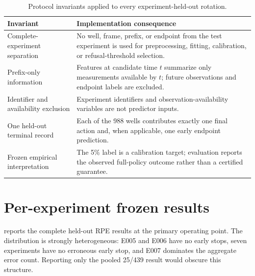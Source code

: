 \documentclass[11pt,twocolumn]{article}
\begin{document}
\begin{table}[H]
\centering
\caption{Protocol invariants applied to every experiment-held-out rotation.}
\label{tab:invariants}
\normalsize
\begin{tabularx}{0.96\textwidth}{@{}>{\raggedright\arraybackslash}p{}>{\raggedright\arraybackslash}X@{}}
\toprule
Invariant & Implementation consequence \\
\midrule
Complete-experiment separation & No well, frame, prefix, or endpoint from the test experiment is
used for preprocessing, fitting, calibration, or refusal-threshold selection. \\
Prefix-only information & Features at candidate time $t$ summarize only measurements available by
$t$; future observations and endpoint labels are excluded. \\
Identifier and availability exclusion & Experiment identifiers and observation-availability
variables are not predictor inputs. \\
One held-out terminal record & Each of the 988 wells contributes exactly one final action and, when
applicable, one early endpoint prediction. \\
Frozen empirical interpretation & The 5\% label is a calibration target; evaluation reports the
observed full-policy outcome rather than a certified guarantee. \\
\bottomrule
\end{tabularx}
\end{table}

\clearpage
\section{Per-experiment frozen results}

 reports the complete held-out RPE results at the primary operating point.
The distribution is strongly heterogeneous: E005 and E006 have no early stops, seven experiments
have no erroneous early stop, and E007 dominates the aggregate error count. Reporting only the
pooled 25/439 result would obscure this structure.
\end{document}
